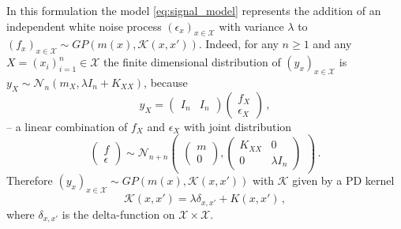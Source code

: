 \documentclass[a4paper,14pt]{extarticle}
\newcommand{\Ncal}{\mathcal{N}}
\newcommand{\Kcal}{\mathcal{K}}
\newcommand{\Xcal}{\mathcal{X}}
\begin{document}
In this formulation the model \ref{eq:signal_model} represents the addition of an
independent white noise process $(\epsilon_x)_{x\in \Xcal}$ with variance $\lambda$
to $(f_x)_{x\in \Xcal} \sim GP(m(x), \Kcal(x,x'))$. Indeed, for any $n\geq1$ and
any $X = (x_i)_{i=1}^n \in \Xcal$ the finite dimensional distribution of $(y_x)_{x\in\Xcal}$
is $y_X\sim \Ncal_n(m_X, \lambda I_n + K_{XX})$, because
\begin{equation*}
  y_X
    = \begin{pmatrix} I_n & I_n \end{pmatrix}
    \begin{pmatrix} f_X \\ \epsilon_X \end{pmatrix}
    \,,
\end{equation*}
-- a linear combination of $f_X$ and $\epsilon_X$ with joint distribution
\begin{equation*}
  \begin{pmatrix} f \\ \epsilon \end{pmatrix}
    \sim \Ncal_{n+n}\begin{pmatrix}
        \begin{pmatrix} m \\ 0 \end{pmatrix},
        \begin{pmatrix}
          K_{XX} & 0 \\
          0 & \lambda I_n
        \end{pmatrix}
      \end{pmatrix}
    \,.
\end{equation*}
Therefore $(y_x)_{x\in\Xcal} \sim GP(m(x), \Kcal(x,x'))$ with $\Kcal$ given by a PD
kernel
\begin{equation*}
  \Kcal(x,x') = \lambda \delta_{x,x'} + K(x,x') \,,
\end{equation*}
where $\delta_{x,x'}$ is the delta-function on $\Xcal\times \Xcal$.
\end{document}
